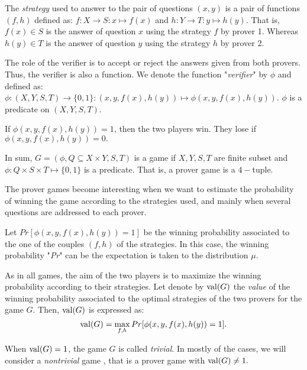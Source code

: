The \textit{strategy} used to answer to
the pair of questions $(x,y)$
is a pair of functions $(f,h)$ defined as: $f: X \longrightarrow S: x \longmapsto f(x)$ and $h: Y \longrightarrow T: y \longmapsto h(y).$
That is, $f(x) \in S$ is the answer of question $x$
using the strategy $f$ by prover 1. Whereas $h(y) \in T$ is the answer of question $y$ using the strategy $h$ by prover 2.

The role of the verifier is to accept or reject the answers given from both provers. Thus, the verifier is also a function. We denote the function
"\textit{verifier}"
by $\phi$ and defined as: $\phi: (X,Y,S,T) \longrightarrow \{0,1\}: (x,y,f(x),h(y)) \longmapsto  \phi(x,y,f(x),h(y)).$ $\phi$ is a predicate on  $(X,Y,S,T).$

If $\phi(x,y,f(x),h(y))=1$, then the two players win. They lose if $\phi(x,y,f(x),h(y))=0.$ 

In sum, $G=(\phi, Q\subseteq X \times Y, S,T)$ is a game if $X,Y,S,T$ are finite subset
and $\phi: Q\times S \times T  \longmapsto \{0,1\}$ is a predicate. That is, a prover game is a $4-$tuple.

The prover games become interesting when we want to estimate the probability of winning the game according to the strategies used, and mainly when several questions are addressed to each prover.

Let $Pr[\phi(x,y,f(x),h(y))=1]$
be the winning probability associated to the one of the couples $(f,h)$ of the strategies. In this case, the winning probability "\textit{Pr}" can be the expectation is taken to the distribution $\mu.$

As in all games, the aim of the two players is to maximize the winning probability according to their strategies. Let denote by $\mathrm{val} (G)$ the \textit{value} of the winning probability associated to the optimal strategies of the two provers for the game $G$. Then, $\mathrm{val} (G)$ is expressed as: $$\mathrm{val} (G)=\max_{f,h} Pr[\phi(x,y,f(x),h(y))=1].$$

When $\mathrm{val} (G)=1$, the game $G$ is called \textit{trivial}. In mostly of the cases, we will consider a \textit{nontrivial} game , that is a prover game with $\mathrm{val} (G) \neq 1.$

